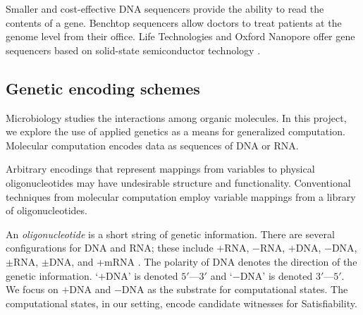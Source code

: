 Smaller and cost-effective DNA sequencers provide the ability to read the contents of a gene.  Benchtop sequencers \cite{ionTorrent, oxfordNanopore} allow doctors to treat patients at the genome level from their office.  Life Technologies and Oxford Nanopore offer gene sequencers based on solid-state semiconductor technology \cite{ionTorrent, oxfordNanopore}.	

\subsection{Genetic encoding schemes}

	Microbiology studies the interactions among organic molecules.  In this project, we explore the use of applied genetics as a means for generalized computation.  Molecular computation encodes data as sequences of DNA or RNA.  

	Arbitrary encodings that represent mappings from variables to physical oligonucleotides may have undesirable structure and functionality.  Conventional techniques from molecular computation employ variable mappings from a library of oligonucleotides.
	
		

	
	An \textit{oligonucleotide} is a short string of genetic information.  There are several configurations for DNA and RNA; these include $+$RNA, $-$RNA, $+$DNA, $-$DNA, $\pm$RNA, $\pm$DNA, and +mRNA \cite{baltimore1971exp}.  The polarity of DNA denotes the direction of the genetic information.  `$+$DNA' is denoted $5'$---$3'$ and `$-$DNA' is denoted $3'$---$5'$.  We focus on $+$DNA and $-$DNA as the substrate for computational states.  The computational states, in our setting, encode candidate witnesses for {\sc Satisfiability}.



